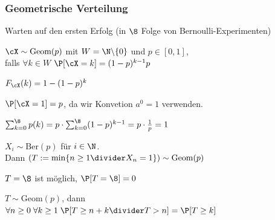 \subsubsection{Geometrische Verteilung}
{\scriptsize Warten auf den ersten Erfolg (in $\8$ Folge von Bernoulli-Experimenten)}

\shortdefinition $\cX \sim \text{Geom}(p)$ mit $W = \N \backslash \{0\}$ und $p \in [0, 1]$,\\
falls $\forall k \in W$ $\P[\cX = k] = (1 - p)^{k - 1} p$

\shortremark[Verteilung] $F_\cX(k) = 1 - (1 - p)^k$

\shortremark $\P[\cX = 1] = p$, da wir Konvetion $a^0 = 1$ verwenden.

\shortremark $\sum_{k = 0}^{\8} p(k) = p \cdot \sum_{k = 0}^{\8} (1 - p)^{k - 1} = p \cdot \frac{1}{p} = 1$

\shorttheorem $X_i \sim \text{Ber}(p)$ für $i \in \N$.\\
Dann $( T := \min\{ n \geq 1 \divider X_n = 1 \} )\sim \text{Geom}(p)$

\shortremark $T = \8$ ist möglich, $\P[T = \8] = 0$

\shorttheorem[Gedächtnislosigkeit] $T \sim \text{Geom}(p)$, dann\\
$\forall n \geq 0 \; \forall k \geq 1 \; \P[T \geq n + k \divider T > n] = \P[T \geq k]$
